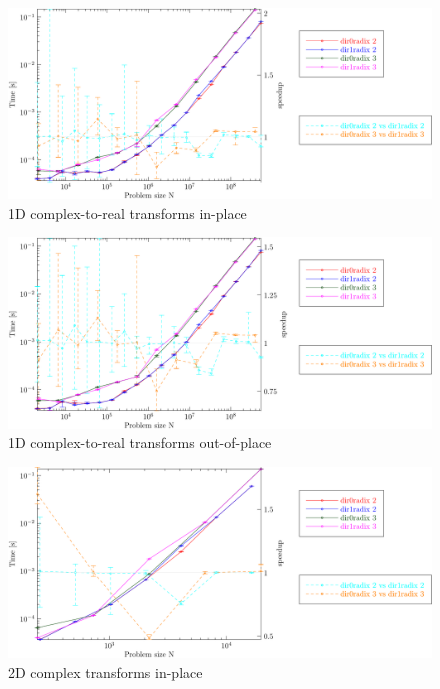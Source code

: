 \documentclass[12pt]{article}
\begin{document}
\centering
\begin{figure}[htbp]
   \includegraphics[width=\textwidth]{1d_c2rinplace_double.pdf}
   \caption{1D complex-to-real transforms in-place}
\end{figure}
\clearpage

\centering
\begin{figure}[htbp]
   \includegraphics[width=\textwidth]{1d_c2routofplace_double.pdf}
   \caption{1D complex-to-real transforms out-of-place}
\end{figure}

\centering
\begin{figure}[htbp]
   \includegraphics[width=\textwidth]{2d_c2cinplace_double.pdf}
   \caption{2D complex transforms in-place}
\end{figure}
\clearpage
\end{document}
